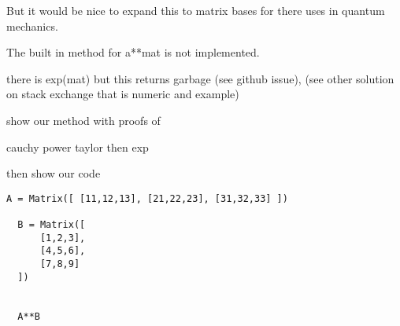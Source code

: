 \documentclass[11pt]{article}
\begin{document}
But it would be nice to expand this to matrix bases for there uses in quantum
mechanics.

The built in method for a**mat is not implemented.

there is exp(mat) but this returns garbage (see github issue), (see other
solution on stack exchange that is numeric and example)

show our method with proofs of

cauchy power taylor then exp

then show our code

\begin{verbatim}
A = Matrix([ [11,12,13], [21,22,23], [31,32,33] ])

  B = Matrix([
      [1,2,3],
      [4,5,6],
      [7,8,9]
  ])


  A**B
\end{verbatim}
\end{document}
